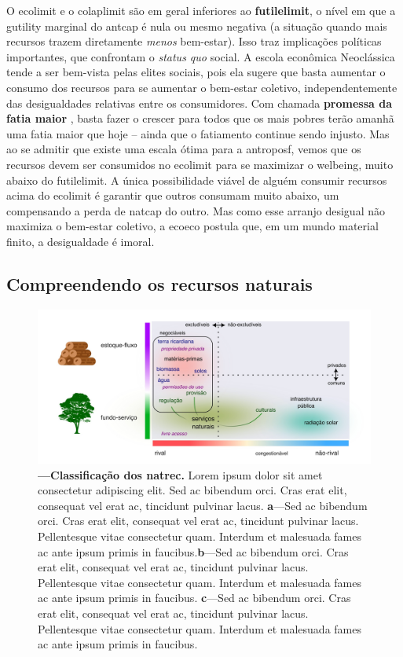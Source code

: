 \documentclass[./main.tex]{subfiles}
\begin{document}
\par O \gls{ecolimit} e o \gls{colaplimit} são em geral inferiores ao \textbf{\gls{futilelimit}}, o nível em que a \gls{gutility} marginal do \gls{antcap} é nula ou mesmo negativa (a situação quando mais recursos trazem diretamente \textit{menos} bem-estar). Isso traz implicações políticas importantes, que confrontam o \textit{status quo} social. A escola econômica Neoclássica tende a ser bem-vista pelas elites sociais, pois ela sugere que basta aumentar o consumo dos recursos para se aumentar o bem-estar coletivo, independentemente das desigualdades relativas entre os consumidores. Com chamada \textbf{promessa da fatia maior} , basta fazer o  crescer para todos que os mais pobres terão amanhã uma fatia maior que hoje – ainda que o fatiamento continue sendo injusto. Mas ao se admitir que existe uma escala ótima para a \gls{antroposf}, vemos que os recursos devem ser consumidos no \gls{ecolimit} para se maximizar o \gls{welbeing}, muito abaixo do \gls{futilelimit}. A única possibilidade viável de alguém consumir recursos acima do \gls{ecolimit} é garantir que outros consumam muito abaixo, um compensando a perda de \gls{natcap} do outro. Mas como esse arranjo desigual não maximiza o bem-estar coletivo, a \gls{ecoeco} postula que, em um mundo material finito, a desigualdade é imoral.  

\subsection{Compreendendo os recursos naturais} \label{subsec:natrec}

\begin{figure}[t!] 
\centering				
\includegraphics[width=0.98\linewidth]{figs/fig_natrec.jpg}		
\caption[Classificação dos recursos naturais]
{\textbf{---\;Classificação dos \gls{natrec}.}
    Lorem ipsum dolor sit amet consectetur adipiscing elit. Sed ac bibendum orci. Cras erat elit, consequat vel erat ac, tincidunt pulvinar lacus. \;\textbf{a}\;---\;Sed ac bibendum orci. Cras erat elit, consequat vel erat ac, tincidunt pulvinar lacus. Pellentesque vitae consectetur quam. Interdum et malesuada fames ac ante ipsum primis in faucibus.\;\textbf{b}\;---\;Sed ac bibendum orci. Cras erat elit, consequat vel erat ac, tincidunt pulvinar lacus. Pellentesque vitae consectetur quam. Interdum et malesuada fames ac ante ipsum primis in faucibus. \;\textbf{c}\;---\;Sed ac bibendum orci. Cras erat elit, consequat vel erat ac, tincidunt pulvinar lacus. Pellentesque vitae consectetur quam. Interdum et malesuada fames ac ante ipsum primis in faucibus.
}
\label{fig:eco:natrec} 		
\end{figure}
\end{document}
